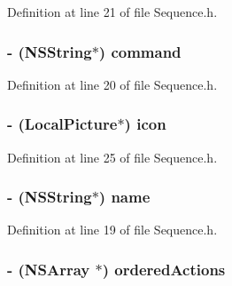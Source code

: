Definition at line 21 of file Sequence.h.

\hypertarget{interface_sequence_a2522bcccf0cad2b648b173e46f9ae203}{
\subsubsection[{command}]{\setlength{\rightskip}{0pt plus 5cm}-\/ (NSString$\ast$) command}}
\label{interface_sequence_a2522bcccf0cad2b648b173e46f9ae203}


Definition at line 20 of file Sequence.h.

\hypertarget{interface_sequence_a21e2c6aa7561358d31fa0a3b1c8b25f2}{
\subsubsection[{icon}]{\setlength{\rightskip}{0pt plus 5cm}-\/ ({\bf LocalPicture}$\ast$) icon}}
\label{interface_sequence_a21e2c6aa7561358d31fa0a3b1c8b25f2}


Definition at line 25 of file Sequence.h.

\hypertarget{interface_sequence_a4b93d352d2fca75b34e1b5a50e03f587}{
\subsubsection[{name}]{\setlength{\rightskip}{0pt plus 5cm}-\/ (NSString$\ast$) name}}
\label{interface_sequence_a4b93d352d2fca75b34e1b5a50e03f587}


Definition at line 19 of file Sequence.h.

\hypertarget{interface_sequence_a164cc483425dfdc4ebb3134cbbc211a3}{
\subsubsection[{orderedActions}]{\setlength{\rightskip}{0pt plus 5cm}-\/ (NSArray $\ast$) orderedActions}}
\label{interface_sequence_a164cc483425dfdc4ebb3134cbbc211a3}


